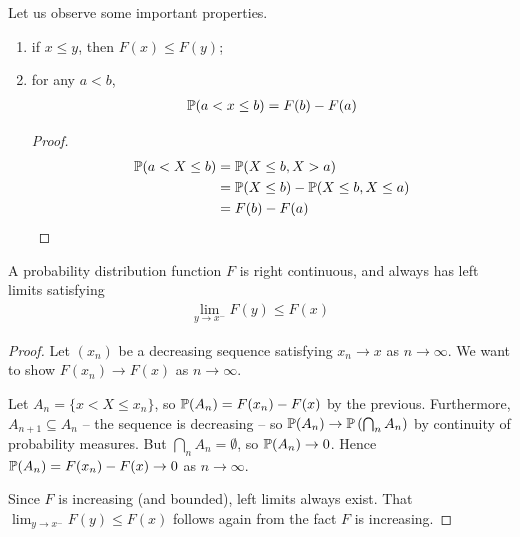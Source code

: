 \documentclass{../../template/note}
\begin{document}
    Let us observe some important properties.
    \begin{enumerate}[label=\protect\circled{\arabic*}]
        \item if \(x \leq y\), then \(F(x) \leq F(y)\);
        \item for any \(a < b\),
        \begin{align*}
            \mathbb P(a < x \leq b) = F(b) - F(a)
        \end{align*}
        \begin{proof}
            \begin{align*}
                \mathbb P(a < X \leq b) &= \mathbb P(X \leq b, X > a) \\
                &= \mathbb P(X \leq b) - \mathbb P(X \leq b, X \leq a) \\
                &= F(b) - F(a)
            \end{align*}
        \end{proof}
    \end{enumerate}

    
    \begin{proposition}
        A probability distribution function \(F\) is right continuous, and always has left limits satisfying
        \begin{align*}
            \lim_{y \to x^-}F(y) \leq F(x)
        \end{align*}
    \end{proposition}
    
    \begin{proof}
        Let \((x_n)\) be a decreasing sequence satisfying \(x_n \to x\) as \(n \to \infty\). We want to show \(F(x_n) \to F(x)\) as \(n \to \infty\).

        Let \(A_n = \{x < X \leq x_n\}\), so \(\mathbb P(A_n) = F(x_n) - F(x)\) by the previous. Furthermore, \(A_{n+1} \subseteq A_n\) -- the sequence is decreasing -- so \(\mathbb P(A_n) \to \mathbb P\left(\bigcap_n A_n\right)\) by continuity of probability measures. But \(\bigcap_n A_n = \emptyset\), so \(\mathbb P(A_n) \to 0\). Hence \(\mathbb P(A_n)= F(x_n) - F(x) \to 0\) as \(n \to \infty\).

        Since \(F\) is increasing (and bounded), left limits always exist. That \(\lim_{y \to x^-} F(y) \leq F(x)\) follows again from the fact \(F\) is increasing.
    \end{proof}
    
\end{document}
